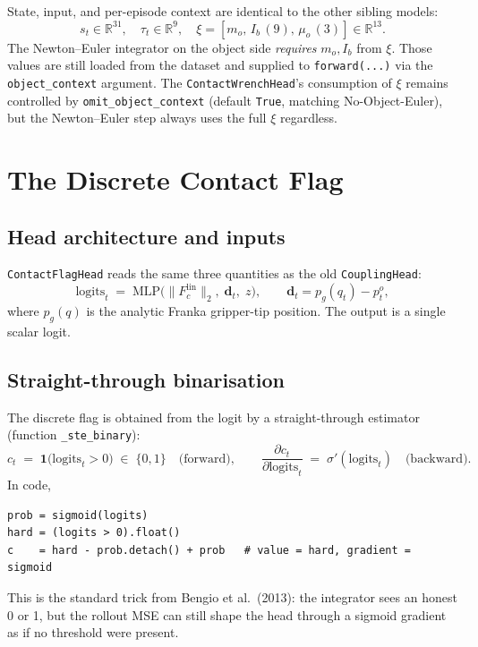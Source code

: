 \documentclass[11pt]{article}
\begin{document}
State, input, and per-episode context are identical to the other
sibling models:
\begin{equation}
  s_t \in \mathbb{R}^{31},\quad
  \tau_t \in \mathbb{R}^{9},\quad
  \xi = [m_o,\,I_b\,\mathrm{(9)},\,\mu_o\,(3)] \in \mathbb{R}^{13}.
\end{equation}
The Newton--Euler integrator on the object side \emph{requires}
$m_o, I_b$ from $\xi$.  Those values are still loaded from the
dataset and supplied to \texttt{forward(...)} via the
\texttt{object\_context} argument.  The \texttt{ContactWrenchHead}'s
consumption of $\xi$ remains controlled by
\texttt{omit\_object\_context} (default \texttt{True}, matching
No-Object-Euler), but the Newton--Euler step always uses the full
$\xi$ regardless.

\section{The Discrete Contact Flag}

\subsection{Head architecture and inputs}

\texttt{ContactFlagHead} reads the same three quantities as the old
\texttt{CouplingHead}:
\begin{equation}
  \mathrm{logits}_t \;=\; \mathrm{MLP}\bigl(\|F_c^{\mathrm{lin}}\|_2,\;
  \mathbf{d}_t,\; z\bigr),
  \qquad
  \mathbf{d}_t = p_g(q_t) - p^o_t,
  \label{eq:cfd-logits}
\end{equation}
where $p_g(q)$ is the analytic Franka gripper-tip position.  The
output is a single scalar logit.

\subsection{Straight-through binarisation}

The discrete flag is obtained from the logit by a
straight-through estimator (function \texttt{\_ste\_binary}):
\begin{equation}
  c_t
  \;=\;
  \mathbf{1}\bigl(\mathrm{logits}_t > 0\bigr)
  \;\in\;
  \{0, 1\}
  \quad\text{(forward)},
  \qquad
  \frac{\partial c_t}{\partial \mathrm{logits}_t}
  \;=\;
  \sigma'(\mathrm{logits}_t)
  \quad\text{(backward)}.
  \label{eq:cfd-ste}
\end{equation}
In code,
\begin{lstlisting}
prob = sigmoid(logits)
hard = (logits > 0).float()
c    = hard - prob.detach() + prob   # value = hard, gradient = sigmoid
\end{lstlisting}
This is the standard trick from Bengio et al.\ (2013): the integrator
sees an honest 0 or 1, but the rollout MSE can still shape the head
through a sigmoid gradient as if no threshold were present.
\end{document}
